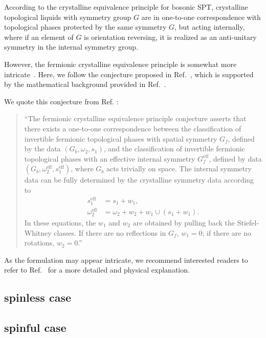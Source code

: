 \documentclass[%
 reprint,
 amsmath,amssymb,
 aps,
prb,
]{revtex4-2}
\begin{document}
According to the crystalline equivalence principle \cite{Else2018} for bosonic SPT, crystalline topological liquids with symmetry group $G$ are in one-to-one correspondence with topological phases protected by the same symmetry $G$, but acting
internally, where if an element of $G$ is orientation reversing, it is realized as an anti-unitary symmetry in the internal symmetry group.

However, the fermionic crystalline equivalence principle is somewhat more intricate~\cite{Debray2021,Manjunath2023}. Here, we follow the conjecture proposed in Ref.~\cite{Manjunath2023}, which is supported by the mathematical background provided in Ref.~\cite{Debray2021}.

We quote this conjecture from Ref. \cite{Manjunath2023}:
\begin{quote}
``The fermionic crystalline equivalence principle conjecture asserts that there exists a one-to-one correspondence between the classification of invertible fermionic topological phases with spatial symmetry $G_{f}$,
defined by the data $(G_{b}, \omega _{2}, s_{1})$, and the classification of invertible fermionic topological phases with an effective internal symmetry $G_{f} ^{\mathrm{eff}}$, defined by data $(G_{b}, \omega _{2} ^{\mathrm{eff}}, s_{1} ^{\mathrm{eff}})$, where $G_{b}$ acts trivially on space. The internal symmetry data can be fully determined by the crystalline symmetry data according to 
\begin{align}
s_{1} ^{\mathrm{eff}} &=s_{1} +w_{1} ,\label{eq6.1}\\
\omega _{2} ^{\mathrm{eff}} &=\omega _{2} + w_{2} + w_{1} \cup ( s_{1} + w_{1}) .\label{eq6.2}
\end{align}
In these equations, the $w_{1}$ and $w_{2}$ are obtained by pulling back the Stiefel-Whitney classes. If there are no reflections in $G_{f}$, $w_{1}=0$; if there are no rotations, $w_{2}=0$.''
\end{quote}
As the formulation may appear intricate, we recommend interested readers to refer to Ref.~\cite{Manjunath2023} for a more detailed and physical explanation.


\subsection{spinless case}

\subsection{spinful case}
\end{document}
